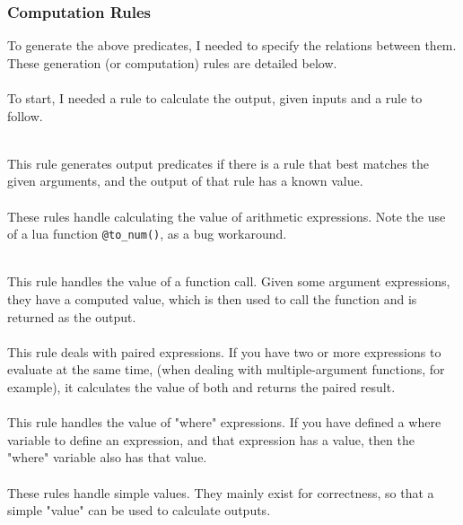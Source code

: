 
\subsubsection{Computation Rules}
To generate the above predicates, I needed to specify the relations between them. These generation (or computation) rules are detailed below. \\ \\
To start, I needed a rule to calculate the output, given inputs and a rule to follow.

 
\mbox{} \\
This rule generates output predicates if there is a rule that best matches the given arguments, and the output of that rule has a known value. \\


\mbox{} \\
These rules handle calculating the value of arithmetic expressions. Note the use of a lua function \lstinline{@to_num()}, as a bug workaround. %


\mbox{} \\
This rule handles the value of a function call. Given some argument expressions, they have a computed value, which is then used to call the function and is returned as the output. \\


\mbox{} \\
This rule deals with paired expressions. If you have two or more expressions to evaluate at the same time, (when dealing with multiple-argument functions, for example), it calculates the value of both and returns the paired result. \\


\mbox{} \\
This rule handles the value of "where" expressions. If you have defined a where variable to define an expression, and that expression has a value, then the "where" variable also has that value.\\


\mbox{} \\
These rules handle simple values. They mainly exist for correctness, so that a simple "value" can be used to calculate outputs.

